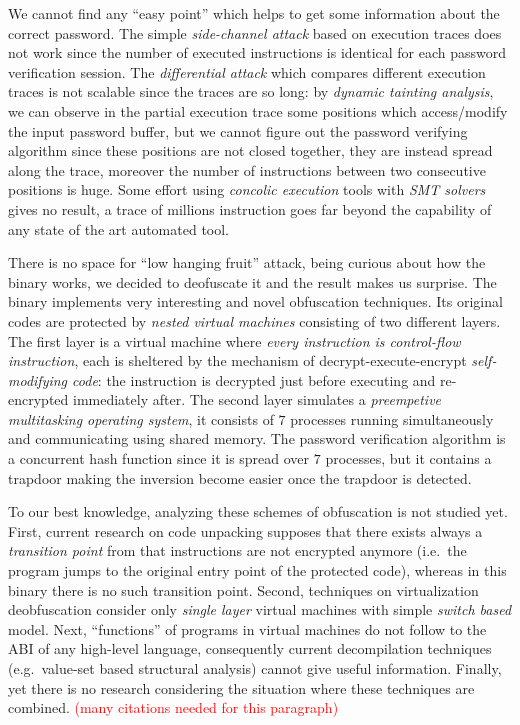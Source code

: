 \documentclass{easychair}
\begin{document}
We cannot find any ``easy point'' which helps to get some information about the correct password. The simple \emph{side-channel attack} based on execution traces does not work since the number of executed instructions is identical for each password verification session. The \emph{differential attack} which compares different execution traces is not scalable since the traces are so long: by \emph{dynamic tainting analysis}, we can observe in the partial execution trace some positions which access/modify the input password buffer, but we cannot figure out the password verifying algorithm since these positions are not closed together, they are instead spread along the trace, moreover the number of instructions between two consecutive positions is huge. Some effort using \emph{concolic execution} tools with \emph{SMT solvers} gives no result, a trace of millions instruction goes far beyond the capability of any state of the art automated tool.

There is no space for ``low hanging fruit'' attack, being curious about how the binary works, we decided to deofuscate it and the result makes us surprise. The binary implements very interesting and novel obfuscation techniques. Its original codes are protected by \emph{nested virtual machines} consisting of two different layers. The first layer is a virtual machine where \emph{every instruction is control-flow instruction}, each is sheltered by the mechanism of decrypt-execute-encrypt \emph{self-modifying code}: the instruction is decrypted just before executing and re-encrypted immediately after. The second layer simulates a \emph{preempetive multitasking operating system}, it consists of $7$ processes running simultaneously and communicating using shared memory. The password verification algorithm is a concurrent hash function since it is spread over $7$ processes, but it contains a trapdoor making the inversion become easier once the trapdoor is detected.


To our best knowledge, analyzing these schemes of obfuscation is not studied yet. First, current research on code unpacking supposes that there exists always a \emph{transition point} from that instructions are not encrypted anymore (i.e.~the program jumps to the original entry point of the protected code), whereas in this binary there is no such transition point. Second, techniques on virtualization deobfuscation consider only \emph{single layer} virtual machines with simple \emph{switch based} model. Next, ``functions'' of programs in virtual machines do not follow to the ABI of any high-level language, consequently current decompilation techniques (e.g.~value-set based structural analysis) cannot give useful information. Finally, yet there is no research considering the situation where these techniques are combined. \textcolor{red}{(many citations needed for this paragraph)}
\end{document}
